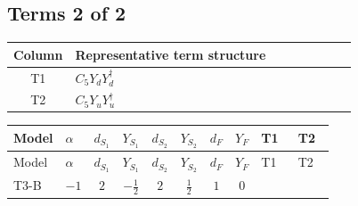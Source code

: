 \documentclass[8pt]{article}
\begin{document}
\begin{landscape}
\subsection*{Terms 2 of 2}
\begin{center}
\begin{tabular}{@{}c >{\raggedright\arraybackslash}p{0.82\linewidth}@{}}
\toprule
Column & Representative term structure \\
\midrule
T1 & \(\displaystyle C_{5} Y_d Y_d^\dagger\) \\
\midrule
T2 & \(\displaystyle C_{5} Y_u Y_u^\dagger\) \\
\midrule
\bottomrule
\end{tabular}
\end{center}
\smallskip
\tiny
\begin{longtable}{@{}llcccccc >{\raggedright\arraybackslash}p{0.21\linewidth} >{\raggedright\arraybackslash}p{0.21\linewidth}@{}}
\toprule
Model & $\alpha$ & $d_{S_1}$ & $Y_{S_1}$ & $d_{S_2}$ & $Y_{S_2}$ & $d_F$ & $Y_F$ & T1 & T2 \\
\midrule
\endfirsthead
\toprule
Model & $\alpha$ & $d_{S_1}$ & $Y_{S_1}$ & $d_{S_2}$ & $Y_{S_2}$ & $d_F$ & $Y_F$ & T1 & T2 \\
\midrule
\endhead
T3-B & $-1$ & $2$ & $-\frac{1}{2}$ & $2$ & $\frac{1}{2}$ & $1$ & $0$ & \scriptsize\adjustbox{max width=\linewidth}{$\begin{gathered} 6 C_{5} Y_d Y_d^\dagger\end{gathered}$} & \scriptsize\adjustbox{max width=\linewidth}{$\begin{gathered} 6 C_{5} Y_u Y_u^\dagger\end{gathered}$} \\
\midrule
\bottomrule
\end{longtable}
\end{landscape}
\end{document}

